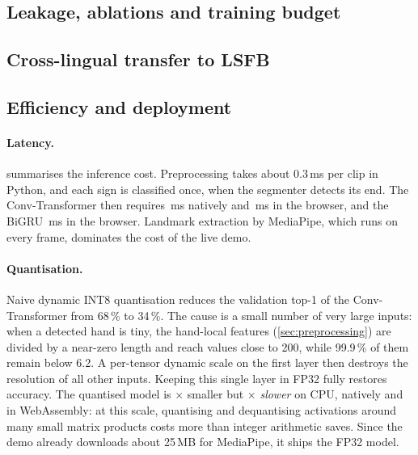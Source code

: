 \subsection{Leakage, ablations and training budget}
\label{sec:ablations}



\subsection{Cross-lingual transfer to LSFB}
\label{sec:transfer}



\subsection{Efficiency and deployment}
\label{sec:efficiency}

\begin{table}[t]
  \centering
  \caption{Model size and single-sign latency on an Apple M1 CPU (one thread) after export to
  ONNX. Native: ONNX Runtime; browser: ONNX Runtime Web (WebAssembly) in Chromium. INT8: dynamic
  quantisation of the weight matrices, with the input projection kept in FP32. Validation top-1
  on 2{,}000 ASL validation clips.}
  \label{tab:export}
  \small
  
\end{table}

\paragraph{Latency.}
 summarises the inference cost. Preprocessing takes about 0.3\,ms per clip in
Python, and each sign is classified once, when the segmenter detects its end. The
Conv-Transformer then requires \numFpNative{}\,ms natively and \numFpBrowser{}\,ms in the browser,
and the BiGRU \numGruBrowser{}\,ms in the browser. Landmark extraction by MediaPipe, which runs on
every frame, dominates the cost of the live demo.

\paragraph{Quantisation.}
Naive dynamic INT8 quantisation reduces the validation top-1 of the Conv-Transformer from 68\,\% to
34\,\%. The cause is a small number of very large inputs: when a detected hand is tiny, the
hand-local features (\cref{sec:preprocessing}) are divided by a near-zero length and reach values
close to 200, while 99.9\,\% of them remain below 6.2. A per-tensor dynamic scale on the first
layer then destroys the resolution of all other inputs. Keeping this single layer in FP32 fully
restores accuracy. The quantised model is \numIntShrink{}$\times$ smaller but
\numIntSlowdown{}$\times$ \emph{slower} on CPU, natively and in WebAssembly: at this scale,
quantising and dequantising activations around many small matrix products costs more than integer
arithmetic saves. Since the demo already downloads about 25\,MB for MediaPipe, it ships the FP32
model.

